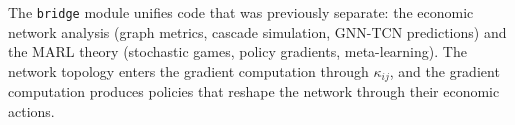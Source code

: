 The \texttt{bridge} module unifies code that was previously separate: the economic network analysis (graph metrics, cascade simulation, GNN-TCN predictions) and the MARL theory (stochastic games, policy gradients, meta-learning). The network topology enters the gradient computation through $\kappa_{ij}$, and the gradient computation produces policies that reshape the network through their economic actions.
